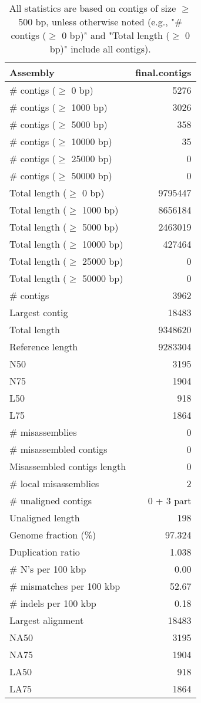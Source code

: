 \documentclass[12pt,a4paper]{article}
\begin{document}
\begin{table}[ht]
\begin{center}
\caption{All statistics are based on contigs of size $\geq$ 500 bp, unless otherwise noted (e.g., "\# contigs ($\geq$ 0 bp)" and "Total length ($\geq$ 0 bp)" include all contigs).}
\begin{tabular}{|l*{1}{|r}|}
\hline
Assembly & final.contigs \\ \hline
\# contigs ($\geq$ 0 bp) & 5276 \\ \hline
\# contigs ($\geq$ 1000 bp) & 3026 \\ \hline
\# contigs ($\geq$ 5000 bp) & 358 \\ \hline
\# contigs ($\geq$ 10000 bp) & 35 \\ \hline
\# contigs ($\geq$ 25000 bp) & 0 \\ \hline
\# contigs ($\geq$ 50000 bp) & 0 \\ \hline
Total length ($\geq$ 0 bp) & 9795447 \\ \hline
Total length ($\geq$ 1000 bp) & 8656184 \\ \hline
Total length ($\geq$ 5000 bp) & 2463019 \\ \hline
Total length ($\geq$ 10000 bp) & 427464 \\ \hline
Total length ($\geq$ 25000 bp) & 0 \\ \hline
Total length ($\geq$ 50000 bp) & 0 \\ \hline
\# contigs & 3962 \\ \hline
Largest contig & 18483 \\ \hline
Total length & 9348620 \\ \hline
Reference length & 9283304 \\ \hline
N50 & 3195 \\ \hline
N75 & 1904 \\ \hline
L50 & 918 \\ \hline
L75 & 1864 \\ \hline
\# misassemblies & 0 \\ \hline
\# misassembled contigs & 0 \\ \hline
Misassembled contigs length & 0 \\ \hline
\# local misassemblies & 2 \\ \hline
\# unaligned contigs & 0 + 3 part \\ \hline
Unaligned length & 198 \\ \hline
Genome fraction (\%) & 97.324 \\ \hline
Duplication ratio & 1.038 \\ \hline
\# N's per 100 kbp & 0.00 \\ \hline
\# mismatches per 100 kbp & 52.67 \\ \hline
\# indels per 100 kbp & 0.18 \\ \hline
Largest alignment & 18483 \\ \hline
NA50 & 3195 \\ \hline
NA75 & 1904 \\ \hline
LA50 & 918 \\ \hline
LA75 & 1864 \\ \hline
\end{tabular}
\end{center}
\end{table}
\end{document}
